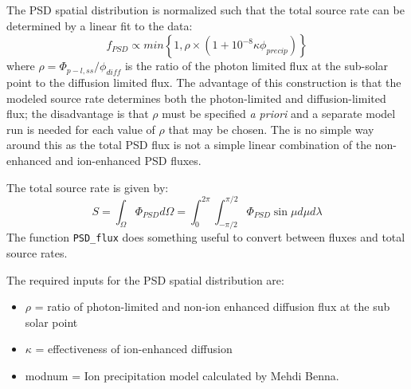 \documentclass[11pt]{article}
\begin{document}
\begin{enumerate}
The PSD spatial distribution is normalized such that the total source rate can
be determined by a linear fit to the data:
\begin{equation}
f_{PSD} \propto min \left\{1, \rho \times \left(1 + 10^{-8} \kappa \phi_{precip}
\right) \right\}
\end{equation}
where $\rho = \Phi_{p-l,ss}/\phi_{diff}$ is the ratio of the photon limited
flux at the sub-solar point to the diffusion limited flux. The advantage of
this construction is that the modeled source rate determines both the
photon-limited and diffusion-limited flux; the disadvantage is that $\rho$ must
be specified \textit{a priori} and a separate model run is needed for each
value of $\rho$ that may be chosen. The is no simple way around this as the
total PSD flux is not a simple linear combination of the non-enhanced and
ion-enhanced PSD fluxes. 

The total source rate is given by: 
\begin{equation}
S = \int_\Omega \Phi_{PSD} d\Omega = \int_0^{2\pi} \int_{-\pi/2}^{\pi/2} 
  \Phi_{PSD} \sin \mu d\mu d\lambda
\end{equation}
The function \texttt{PSD\_flux} does something useful to convert between fluxes
and total source rates.

The required inputs for the PSD spatial distribution are:
  \begin{itemize}
  \item $\rho$ = ratio of photon-limited and non-ion enhanced diffusion flux at
  the sub solar point
  \item $\kappa$ = effectiveness of ion-enhanced diffusion
  \item modnum = Ion precipitation model calculated by Mehdi Benna.
  \end{itemize}


\end{enumerate}
\end{document}
